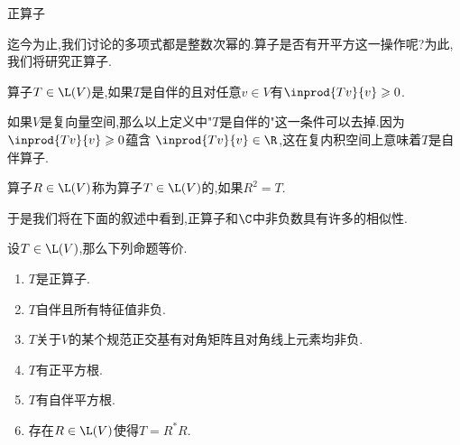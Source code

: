 \documentclass{ctexart}
\begin{document}
\pagestyle{empty}
\begin{center}\large 正算子\end{center}
迄今为止,我们讨论的多项式都是整数次幂的.算子是否有开平方这一操作呢?为此,我们将研究正算子.\\
\begin{definition}[1.1 定义:正算子]
    算子$T\in\L(V)$是,如果$T$是自伴的且对任意$v\in V$有$\inprod{Tv}{v}\geqslant0$.
\end{definition}\noindent
如果$V$是复向量空间,那么以上定义中"$T$是自伴的"这一条件可以去掉.因为$\inprod{Tv}{v}\geqslant0$蕴含%
$\inprod{Tv}{v}\in\R$,这在复内积空间上意味着$T$是自伴算子.
\begin{definition}[1.2 定义:平方根]
    算子$R\in\L(V)$称为算子$T\in\L(V)$的,如果$R^2=T$.
\end{definition}\noindent
于是我们将在下面的叙述中看到,正算子和$\C$中非负数具有许多的相似性.\\
\begin{formal}[2.1 正算子的性质I]
    设$T\in\L(V)$,那么下列命题等价.
    \begin{enumerate}[label=\tbf{(\alph*)}]
        \item $T$是正算子.
        \item $T$自伴且所有特征值非负.
        \item $T$关于$V$的某个规范正交基有对角矩阵且对角线上元素均非负.
        \item $T$有正平方根.
        \item $T$有自伴平方根.
        \item 存在$R\in\L(V)$使得$T=R^*R$.
    \end{enumerate}
\end{formal}
\end{document}
